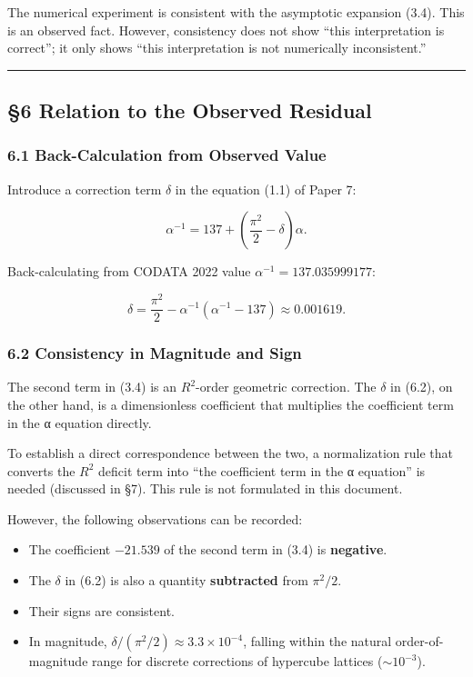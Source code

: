 \documentclass[
]{article}
\providecommand{\tightlist}{%
  \setlength{\itemsep}{0pt}\setlength{\parskip}{0pt}}
\begin{document}
The numerical experiment is consistent with the asymptotic expansion
(3.4). This is an observed fact. However, consistency does not show
``this interpretation is correct''; it only shows ``this interpretation
is not numerically inconsistent.''

\begin{center}\rule{0.5\linewidth}{0.5pt}\end{center}

\subsection{§6 Relation to the Observed
Residual}\label{relation-to-the-observed-residual}

\subsubsection{6.1 Back-Calculation from Observed
Value}\label{back-calculation-from-observed-value}

Introduce a correction term \(\delta\) in the equation (1.1) of Paper 7:

\[\alpha^{-1} = 137 + \left(\frac{\pi^2}{2} - \delta\right)\alpha. \tag{6.1}\]

Back-calculating from CODATA 2022 value \(\alpha^{-1} = 137.035999177\):

\[\delta = \frac{\pi^2}{2} - \alpha^{-1}(\alpha^{-1} - 137) \approx 0.001619. \tag{6.2}\]

\subsubsection{6.2 Consistency in Magnitude and
Sign}\label{consistency-in-magnitude-and-sign}

The second term in (3.4) is an \(R^2\)-order geometric correction. The
\(\delta\) in (6.2), on the other hand, is a dimensionless coefficient
that multiplies the coefficient term in the α equation directly.

To establish a direct correspondence between the two, a normalization
rule that converts the \(R^2\) deficit term into ``the coefficient term
in the α equation'' is needed (discussed in §7). This rule is not
formulated in this document.

However, the following observations can be recorded:

\begin{itemize}
\tightlist
\item
  The coefficient \(-21.539\) of the second term in (3.4) is
  \textbf{negative}.
\item
  The \(\delta\) in (6.2) is also a quantity \textbf{subtracted} from
  \(\pi^2/2\).
\item
  Their signs are consistent.
\item
  In magnitude, \(\delta/(\pi^2/2) \approx 3.3 \times 10^{-4}\), falling
  within the natural order-of-magnitude range for discrete corrections
  of hypercube lattices (\(\sim 10^{-3}\)).
\end{itemize}
\end{document}
